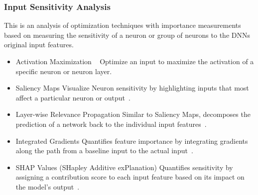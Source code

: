 
\subsubsection{Input Sensitivity Analysis}\label{subsubsec:individual-neuron-importance-analysis}

This is an analysis of optimization techniques with importance measurements based on measuring the sensitivity of a neuron or group of neurons to the DNNs original input features.
\begin{itemize}
    \item Activation Maximization ~\cite{erhan2009visualizing}
    \subitem Optimize an input to maximize the activation of a specific neuron or neuron layer.
    \item Saliency Maps
    \subitem Visualize Neuron sensitivity by highlighting inputs that most affect a particular neuron or output~\cite{hsu2023explainable}.
    \item Layer-wise Relevance Propagation
    \subitem Similar to Saliency Maps, decomposes the prediction of a network back to the individual input features~\cite{jia2022interpreting}.
    \item Integrated Gradients
    \subitem Quantifies feature importance by integrating gradients along the path from a baseline input to the actual input~\cite{sundararajan2017axiomatic}.
    \item SHAP Values (SHapley Additive exPlanation)
    \subitem Quantifies sensitivity by assigning a contribution score to each input feature based on its impact on the model’s output~\cite{nohara2022explanation}.
\end{itemize}